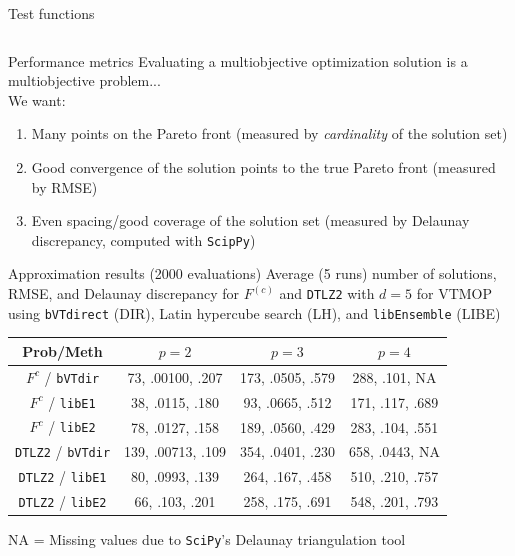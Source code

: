 \documentclass[xcolor=dvipsnames]{beamer}
\begin{document}
\begin{frame}{Test functions}
\begin{columns}
\begin{column}{.4\textwidth}
\end{column}
\end{columns}
\end{frame}
\begin{frame}{Performance metrics}
Evaluating a multiobjective optimization solution is a multiobjective
problem...\\
\medskip
We want:
\begin{enumerate}
\item Many points on the Pareto front (measured by {\it cardinality} of the
solution set)
\item Good convergence of the solution points to the true Pareto front
(measured by RMSE)
\item Even  spacing/good coverage of the solution set
(measured by Delaunay discrepancy, computed with {\tt ScipPy})
\end{enumerate}
\end{frame}
\begin{frame}{Approximation results (2000 evaluations)}
Average (5 runs) number of solutions, RMSE, and Delaunay discrepancy
for $F^{(c)}$ and {\tt DTLZ2} with $d=5$ for VTMOP using {\tt bVTdirect} (DIR),
Latin hypercube search (LH),
and {\tt libEnsemble} (LIBE)\\
\begin{center}
{\small
\begin{tabular}{c|ccc}
Prob/Meth&$p=2$&$p=3$&$p=4$\\
\hline
{$F^c$ / {\tt bVTdir}} & 73, .00100, .207 & 173, .0505, .579 & 288, .101, NA\\
{$F^c$ / {\tt libE1}} & 38, .0115, .180 & 93, .0665, .512 & 171, .117, .689\\
{$F^c$ / {\tt libE2}} & 78, .0127, .158 & 189, .0560, .429 & 283, .104, .551\\
\hline
{{\tt DTLZ2} / {\tt bVTdir}} & 139, .00713, .109 & 354, .0401, .230 & 658, .0443, NA\\
{{\tt DTLZ2} / {\tt libE1}} & 80, .0993, .139 & 264, .167, .458 & 510, .210, .757\\
{{\tt DTLZ2} / {\tt libE2}} & 66, .103, .201 & 258, .175, .691 & 548, .201, .793\\
\end{tabular}
}
\end{center}
NA = Missing values due to {\tt SciPy}'s Delaunay triangulation tool
\end{frame}
\end{document}
